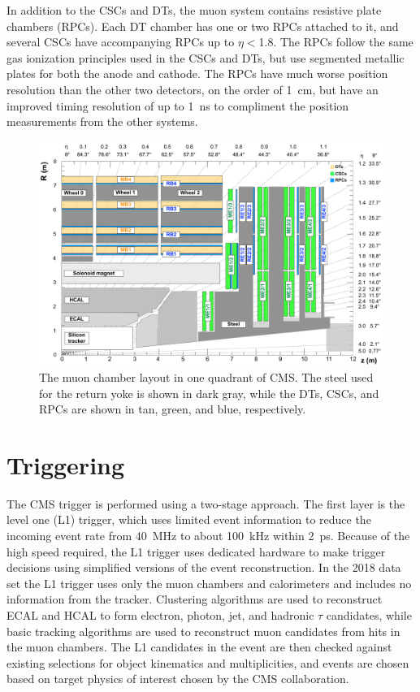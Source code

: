 In addition to the CSCs and DTs, the muon system contains resistive plate chambers (RPCs). 
Each DT chamber has one or two RPCs attached to it, and several CSCs have accompanying RPCs up to $\eta<$1.8. 
The RPCs follow the same gas ionization principles used in the CSCs and DTs, but use segmented metallic plates for both the anode and cathode.
The RPCs have much worse position resolution than the other two detectors, on the order of \SI{1}{\centi\meter}, but have an improved timing resolution of up to \SI{1}{\nano\second} to compliment the position measurements from the other systems.

\begin{figure}[ht]
    \includegraphics[width=\textwidth]{figures/cms_quadrant_run_ii.pdf}
    \centering
    \caption[Muon chamber layout in Run 2]{The muon chamber layout in one quadrant of CMS. The steel used for the return yoke is shown in dark gray, while the DTs, CSCs, and RPCs are shown in tan, green, and blue, respectively.}
    \label{fig:cscLayout}
\end{figure}


\section{Triggering}
The CMS trigger is performed using a two-stage approach. The first layer is the level one (L1) trigger, which uses limited event information to reduce the incoming event rate from \SI{40}{\mega\hertz} to about \SI{100}{\kilo\hertz} within \SI{2}{\pico\second}. 
Because of the high speed required, the L1 trigger uses dedicated hardware to make trigger decisions using simplified versions of the event reconstruction.
In the 2018 data set the L1 trigger uses only the muon chambers and calorimeters and includes no information from the tracker.
Clustering algorithms are used to reconstruct ECAL and HCAL to form electron, photon, jet, and hadronic $\tau$ candidates, while basic tracking algorithms are used to reconstruct muon candidates from hits in the muon chambers.
The L1 candidates in the event are then checked against existing selections for object kinematics and multiplicities, and events are chosen based on target physics of interest chosen by the CMS collaboration.

